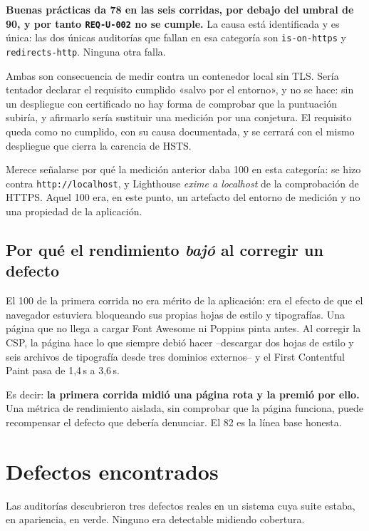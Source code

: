 \documentclass[11pt,a4paper]{article}
\newcommand{\req}[1]{\texttt{#1}}
\begin{document}
\textbf{Buenas prácticas da 78 en las seis corridas, por debajo del umbral de
90, y por tanto \req{REQ-U-002} no se cumple.} La causa está identificada y es
única: las dos únicas auditorías que fallan en esa categoría son
\texttt{is-on-https} y \texttt{redirects-http}. Ninguna otra falla.

Ambas son consecuencia de medir contra un contenedor local sin TLS. Sería
tentador declarar el requisito cumplido «salvo por el entorno», y no se hace:
sin un despliegue con certificado no hay forma de comprobar que la puntuación
subiría, y afirmarlo sería sustituir una medición por una conjetura. El
requisito queda como no cumplido, con su causa documentada, y se cerrará con el
mismo despliegue que cierra la carencia de HSTS.

Merece señalarse por qué la medición anterior daba 100 en esta categoría: se
hizo contra \texttt{http://localhost}, y Lighthouse \emph{exime a localhost} de
la comprobación de HTTPS. Aquel 100 era, en este punto, un artefacto del
entorno de medición y no una propiedad de la aplicación.

\subsection{Por qué el rendimiento \emph{bajó} al corregir un defecto}

El 100 de la primera corrida no era mérito de la aplicación: era el efecto de que
el navegador estuviera bloqueando sus propias hojas de estilo y tipografías. Una
página que no llega a cargar Font Awesome ni Poppins pinta antes. Al corregir la
CSP, la página hace lo que siempre debió hacer --descargar dos hojas de estilo y
seis archivos de tipografía desde tres dominios externos-- y el First Contentful
Paint pasa de 1,4\,s a 3,6\,s.

Es decir: \textbf{la primera corrida midió una página rota y la premió por ello.}
Una métrica de rendimiento aislada, sin comprobar que la página funciona, puede
recompensar el defecto que debería denunciar. El 82 es la línea base honesta.

\section{Defectos encontrados}\label{sec:defectos}

Las auditorías descubrieron tres defectos reales en un sistema cuya suite estaba,
en apariencia, en verde. Ninguno era detectable midiendo cobertura.
\end{document}
